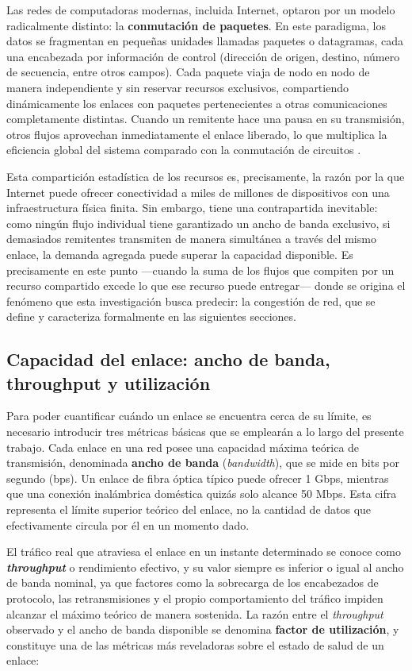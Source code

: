 \documentclass[12pt]{report}
\begin{document}
Las redes de computadoras modernas, incluida Internet, optaron por un modelo radicalmente distinto: la \textbf{conmutación de paquetes}. En este paradigma, los datos se fragmentan en pequeñas unidades llamadas paquetes o datagramas, cada una encabezada por información de control (dirección de origen, destino, número de secuencia, entre 
otros campos). Cada paquete viaja de nodo en nodo de manera independiente y sin reservar recursos exclusivos, compartiendo dinámicamente los enlaces con paquetes pertenecientes a otras comunicaciones completamente distintas. Cuando un remitente hace una pausa en su transmisión, otros flujos aprovechan inmediatamente el enlace liberado, 
lo que multiplica la eficiencia global del sistema comparado con la conmutación de circuitos \cite{kurose2017}.

Esta compartición estadística de los recursos es, precisamente, la razón por la que Internet puede ofrecer conectividad a miles de millones de dispositivos con una infraestructura física finita. Sin embargo, tiene una contrapartida inevitable: como ningún flujo individual tiene garantizado un ancho de banda exclusivo, si demasiados 
remitentes transmiten de manera simultánea a través del mismo enlace, la demanda agregada puede superar la capacidad disponible. Es precisamente en este punto —cuando la suma de los flujos que compiten por un recurso compartido excede lo que ese recurso puede entregar— donde se origina el fenómeno que esta investigación busca predecir: 
la congestión de red, que se define y caracteriza formalmente en las siguientes secciones.

\subsection{Capacidad del enlace: ancho de banda, throughput y utilización}
\label{subsec:capacidad_enlace}

Para poder cuantificar cuándo un enlace se encuentra cerca de su límite, es necesario introducir tres métricas básicas que se emplearán a lo largo del presente trabajo. Cada enlace en una red posee una capacidad máxima teórica de transmisión, denominada \textbf{ancho de banda} (\textit{bandwidth}), que se mide en bits por segundo (bps). 
Un enlace de fibra óptica típico puede ofrecer 1 Gbps, mientras que una conexión inalámbrica doméstica quizás solo alcance 50 Mbps. Esta cifra representa el límite superior teórico del enlace, no la cantidad de datos que efectivamente circula por él en un momento dado.

El tráfico real que atraviesa el enlace en un instante determinado se conoce como \textbf{\textit{throughput}} o rendimiento efectivo, y su valor siempre es inferior o igual al ancho de banda nominal, ya que factores como la sobrecarga de los encabezados de protocolo, las retransmisiones y el propio comportamiento del tráfico impiden 
alcanzar el máximo teórico de manera sostenida. La razón entre el \textit{throughput} observado y el ancho de banda disponible se denomina \textbf{factor de utilización}, y constituye una de las métricas más reveladoras sobre el estado de salud de un enlace:
\end{document}
